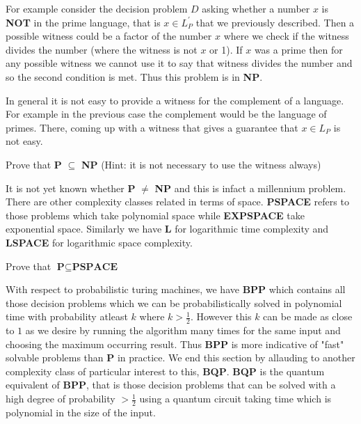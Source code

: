 For example consider the decision problem $D$ asking whether a number $x$ is \textbf{NOT} in the prime language, that is $ x \in L_P^{'}$ that we previously described. Then a possible witness could be a factor of the number $x$ where we check if the witness divides the number (where the witness is not $x$ or 1). If $x$ was a prime then for any possible witness we cannot use it to say that witness divides the number  and so the second condition is met. Thus this problem is in \textbf{NP}.

In general it is not easy to provide a witness for the complement of a language. For example in the previous case the complement would be the language of primes. There, coming up with a witness that gives a guarantee that $x \in L_P$ is not easy.

\begin{exercise}
Prove that \textbf{P} $\subseteq$ \textbf{NP}
(Hint: it is not necessary to use the witness always)
\end{exercise}
It is not yet known whether  \textbf{P} $\neq$ \textbf{NP} and this is infact a millennium problem. 
There are other complexity classes related in terms of space. \textbf{PSPACE} refers to those problems which take polynomial space while \textbf{EXPSPACE} take exponential space. Similarly we have \textbf{L} for logarithmic time complexity and \textbf{LSPACE} for logarithmic space complexity.

\begin{exercise}
Prove that $\textbf{P} \subseteq \textbf{PSPACE}$
\end{exercise}
With respect to probabilistic turing machines, we have \textbf{BPP} which contains all those decision problems which we can be probabilistically solved in polynomial time with probability atleast $k$ where $k > \frac{1}{2}$. However this $k$ can be made as close to $1$ as we desire by running the algorithm many times for the same input and choosing the maximum occurring result. Thus \textbf{BPP} is more indicative of "fast" solvable problems than \textbf{P} in practice.
We end this section by allauding to another complexity class of particular interest to this, \textbf{BQP}. \textbf{BQP} is the quantum equivalent of \textbf{BPP}, that is those decision problems that can be solved with a high degree of probability $ > \frac{1}{2}$ using a quantum circuit taking time which is polynomial in the size of the input.

\clearpage